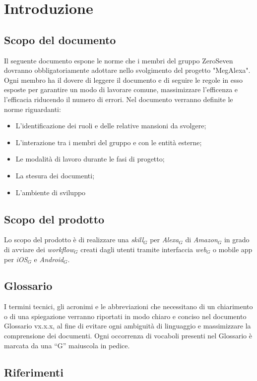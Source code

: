 \newpage
\section{Introduzione}
\subsection{Scopo del documento}
Il seguente documento espone le norme che i membri del gruppo ZeroSeven dovranno obbligatoriamente adottare nello svolgimento del progetto "MegAlexa".
Ogni membro ha il dovere di leggere il documento e di seguire le regole in esso esposte per garantire  un modo di lavorare comune, massimizzare l'efficenza e l'efficacia riducendo il numero di errori.
Nel documento verranno definite le  norme riguardanti:
\begin{itemize}
		\item L'identificazione dei ruoli e delle relative mansioni da svolgere;
		\item L'interazione tra i membri del gruppo e con le entità esterne;
		\item Le modalità di lavoro durante le fasi di progetto;
		\item La stesura dei documenti;
		\item L'ambiente di sviluppo
\end{itemize}

\subsection{Scopo del prodotto}
Lo scopo del prodotto è di realizzare una \textit{skill$_{G}$} per \textit{Alexa$_{G}$} di \textit{Amazon$_{G}$} in grado di avviare dei \textit{workflow$_{G}$} creati dagli utenti tramite interfaccia \textit{web$_{G}$} o mobile app per \textit{iOS$_{G}$} e \textit{Android$_{G}$}.

\subsection{Glossario}
I termini tecnici, gli acronimi e le abbreviazioni che necessitano di un chiarimento
o di una spiegazione verranno riportati in modo chiaro e conciso nel
documento Glossario vx.x.x, al fine di evitare ogni ambiguità di linguaggio
e massimizzare la comprensione dei documenti. Ogni occorrenza di vocaboli
presenti nel Glossario è marcata da una “G” maiuscola in pedice.

\subsection{Riferimenti}
